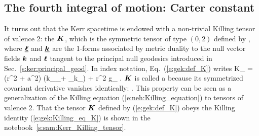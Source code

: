 \subsection{The fourth integral of motion: Carter constant} \label{s:gek:Carter_const}

It turns out that the Kerr spacetime is endowed with a non-trivial
Killing tensor of valence 2: the
 $\bm{K}$, which is the symmetric tensor of type
$(0,2)$ defined by
\be \label{e:gek:def_K}
     ,
\ee
where $\underline{\bm{\ell}}$ and $\underline{\bm{k}}$ are the 1-forms associated by metric duality
to the null vector fields $\bm{k}$ and $\bm{\ell}$ tangent to the principal null
geodesics introduced in Sec.~\ref{s:ker:principal_geod}. In index notation,
Eq.~(\ref{e:gek:def_K}) writes
\be
    K_{\alpha\beta} = (r^2 + a^2) \left(k_\alpha \el_\beta + \el_\alpha k_\beta \right)
        + r^2 g_{\alpha\beta} .
\ee
$\bm{K}$ is called a  because its symmetrized covariant derivative vanishes identically:
\be \label{e:gek:Killing_eq_K}
    .
\ee
This property can be seen as a generalization of the Killing equation
(\ref{e:neh:Killing_equation}) to tensors of valence 2.
That the tensor $\bm{K}$ defined by (\ref{e:gek:def_K}) obeys the Killing
identity (\ref{e:gek:Killing_eq_K}) is shown in the notebook~\ref{s:sam:Kerr_Killing_tensor}.

